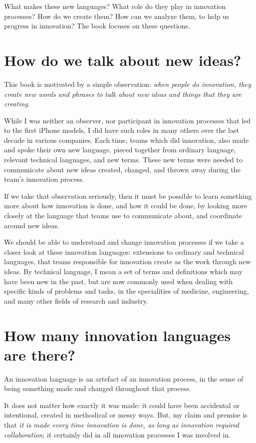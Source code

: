 What makes these new languages? What role do they play in innovation processes? How do we create them? How can we analyze them, to help us progress in innovation? The book focuses on these questions.

\section{How do we talk about new ideas?}
\label{c1-s2}
This book is motivated by a simple observation: \textit{when people do innovation, they create new words and phrases to talk about new ideas and things that they are creating}. 

While I was neither an observer, nor participant in innovation processes that led to the first iPhone models, I did have such roles in many others over the last decade in various companies. Each time, teams which did innovation, also made and spoke their own new language, pieced together from ordinary language, relevant technical languages, and new terms. These new terms were needed to communicate about new ideas created, changed, and thrown away during the team's innovation process. 

If we take that observation seriously, then it must be possible to learn something more about how innovation is done, and how it could be done, by looking more closely at the language that teams use to communicate about, and coordinate around new ideas. 

We should be able to understand and change innovation processes if we take a closer look at these innovation languages: extensions to ordinary and technical languages, that teams responsible for innovation create as the work through new ideas. By technical language, I mean a set of terms and definitions which may have been new in the past, but are now commonly used when dealing with specific kinds of problems and tasks, in the specialities of medicine, engineering, and many other fields of research and industry.

\section{How many innovation languages are there?}
\label{c1-s3}
An innovation language is an artefact of an innovation process, in the sense of being something made and changed throughout that process. 

It does not matter how exactly it was made: it could have been accidental or intentional, created in methodical or messy ways. But, my claim and premise is that \textit{it is made every time innovation is done, as long as innovation required collaboration}; it certainly did in all innovation processes I was involved in. 

